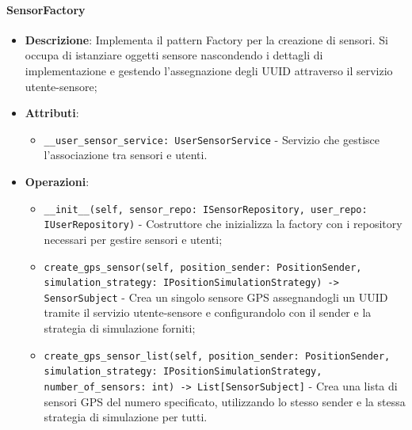 \documentclass[10pt]{article}
\begin{document}
    \paragraph{SensorFactory}
    \begin{itemize} 
    \item \textbf{Descrizione}: Implementa il pattern Factory per la creazione di sensori. Si occupa di istanziare oggetti sensore nascondendo i dettagli di implementazione e gestendo l'assegnazione degli UUID attraverso il servizio utente-sensore;
    \item \textbf{Attributi}:
    \begin{itemize}
        \item \texttt{\_\_user\_sensor\_service: UserSensorService} - Servizio che gestisce l'associazione tra sensori e utenti.
    \end{itemize}
    
    \item \textbf{Operazioni}:
    \begin{itemize}
        \item \texttt{\_\_init\_\_(self, sensor\_repo: ISensorRepository, user\_repo: IUserRepository)} - Costruttore che inizializza la factory con i repository necessari per gestire sensori e utenti;
        
        \item \texttt{create\_gps\_sensor(self, position\_sender: PositionSender, simulation\_strategy: IPositionSimulationStrategy) -> SensorSubject} - Crea un singolo sensore GPS assegnandogli un UUID tramite il servizio utente-sensore e configurandolo con il sender e la strategia di simulazione forniti;
        
        \item \texttt{create\_gps\_sensor\_list(self, position\_sender: PositionSender, simulation\_strategy: IPositionSimulationStrategy, number\_of\_sensors: int) -> List[SensorSubject]} - Crea una lista di sensori GPS del numero specificato, utilizzando lo stesso sender e la stessa strategia di simulazione per tutti.
    \end{itemize}
    \end{itemize}
\end{document}
